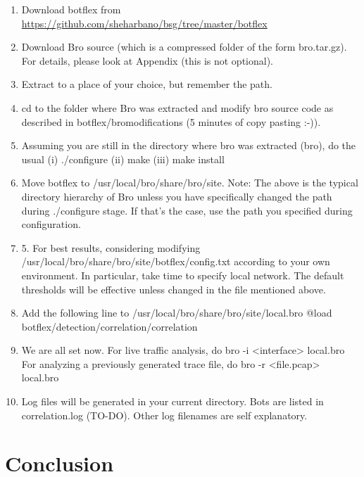 \documentclass[acmtocl]{acmtrans2m}
\begin{document}
\begin{enumerate}
\item Download botflex from
\url{https://github.com/sheharbano/bsg/tree/master/botflex}
\item Download Bro source (which is a compressed folder of the form 
	bro.tar.gz). For details, please look at Appendix (this is not optional).
\item Extract to a place of your choice, but remember the path.
\item cd to the folder where Bro was extracted and modify bro source code as 
   described in botflex/bro\textunderscore modifications (5 minutes of copy pasting :-)). 
\item Assuming you are still in the directory where bro was extracted (bro),
   do the usual (i) ./configure (ii) make (iii) make install
\item Move botflex to /usr/local/bro/share/bro/site.
   Note: The above is the typical directory hierarchy of Bro unless you have	
         specifically changed the path during ./configure stage. If that's
	 the case, use the path you specified during configuration.
\item 5. For best results, considering modifying 
   /usr/local/bro/share/bro/site/botflex/config.txt
   according to your own environment. In particular, take time to
   specify local network. The default thresholds will be effective unless
   changed in the file mentioned above.
\item Add the following line to /usr/local/bro/share/bro/site/local.bro
   @load botflex/detection/correlation/correlation
\item We are all set now. For live traffic analysis, do 
   bro -i <interface> local.bro
   For analyzing a previously generated trace file, do
   bro -r <file.pcap> local.bro
\item Log files will be generated in your current directory. Bots are 
   listed in correlation.log (TO-DO). Other log filenames are self 
   explanatory.
\end{enumerate}
\section{Conclusion}

\appendix
\end{document}
